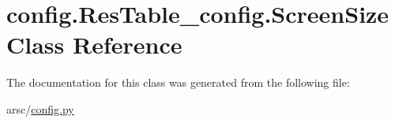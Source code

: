 \hypertarget{classconfig_1_1ResTable__config_1_1ScreenSize}{}\section{config.\+Res\+Table\+\_\+config.\+Screen\+Size Class Reference}
\label{classconfig_1_1ResTable__config_1_1ScreenSize}


The documentation for this class was generated from the following file\+:\begin{DoxyCompactItemize}
\item 
arsc/\mbox{\hyperlink{config_8py}{config.\+py}}\end{DoxyCompactItemize}

